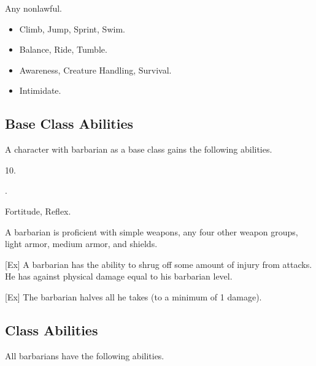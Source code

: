      Any nonlawful.

    \begin{itemize}
        \item {} Climb, Jump, Sprint, Swim.
        \item {} Balance, Ride, Tumble.
        \item {} Awareness, Creature Handling, Survival.
        \item {} Intimidate.
    \end{itemize}

    \subsection{Base Class Abilities}
        A character with barbarian as a base class gains the following abilities.

         10.

         .

          Fortitude,  Reflex.

        A barbarian is proficient with simple weapons, any four other weapon groups, light armor, medium armor, and shields.

        [Ex]
        A barbarian has the ability to shrug off some amount of injury from attacks.
        He has  against physical damage equal to his barbarian level.

        [Ex]
        The barbarian halves all  he takes (to a minimum of 1 damage).

    \subsection{Class Abilities}
        All barbarians have the following abilities.

